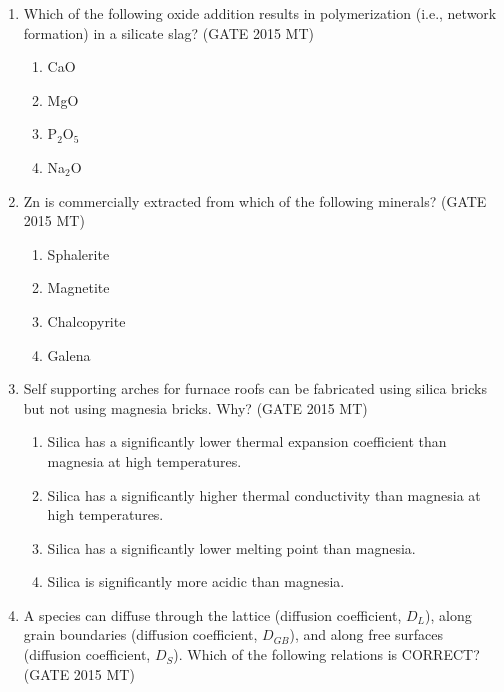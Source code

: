 \documentclass[12pt]{article}
\begin{document}
\begin{enumerate}
\item Which of the following oxide addition results in polymerization (i.e., network formation) in a silicate slag? (GATE 2015 MT)

\vspace{0.5em}
\begin{enumerate}[label=(\alph*)]
    \item CaO
    \item MgO
    \item P$_2$O$_5$
    \item Na$_2$O
\end{enumerate}
\vspace{0.5em}

\item Zn is commercially extracted from which of the following minerals? (GATE 2015 MT)

\vspace{0.5em}
\begin{enumerate}[label=(\alph*)]
    \item Sphalerite
    \item Magnetite
    \item Chalcopyrite
    \item Galena
\end{enumerate}
\vspace{0.5em}

\item Self supporting arches for furnace roofs can be fabricated using silica bricks but not using magnesia bricks. Why? (GATE 2015 MT)

\vspace{0.5em}
\begin{enumerate}[label=(\alph*)]
    \item Silica has a significantly lower thermal expansion coefficient than magnesia at high temperatures.
    \item Silica has a significantly higher thermal conductivity than magnesia at high temperatures.
    \item Silica has a significantly lower melting point than magnesia.
    \item Silica is significantly more acidic than magnesia.
\end{enumerate}
\vspace{0.5em}

\item A species can diffuse through the lattice (diffusion coefficient, $D_L$), along grain boundaries (diffusion coefficient, $D_{GB}$), and along free surfaces (diffusion coefficient, $D_S$). Which of the following relations is CORRECT? (GATE 2015 MT)


\end{enumerate}
\end{document}
